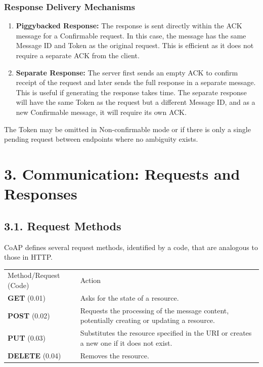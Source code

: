 \documentclass[a4paper, 12pt]{book} %
\begin{document}
\subsubsection{Response Delivery
Mechanisms}\label{response-delivery-mechanisms}

\begin{enumerate}
\def\labelenumi{\arabic{enumi}.}
\tightlist
\item
  \textbf{Piggybacked Response:} The response is sent directly within
  the ACK message for a Confirmable request. In this case, the message
  has the same Message ID and Token as the original request. This is
  efficient as it does not require a separate ACK from the client.
\item
  \textbf{Separate Response:} The server first sends an empty ACK to
  confirm receipt of the request and later sends the full response in a
  separate message. This is useful if generating the response takes
  time. The separate response will have the same Token as the request
  but a different Message ID, and as a new Confirmable message, it will
  require its own ACK.
\end{enumerate}

The Token may be omitted in Non-confirmable mode or if there is only a
single pending request between endpoints where no ambiguity exists.

\section{3. Communication: Requests and
Responses}\label{communication-requests-and-responses}

\subsection{3.1. Request Methods}\label{request-methods}

CoAP defines several request methods, identified by a code, that are
analogous to those in HTTP.

\begin{longtable}[]{@{}
  >{\raggedright\arraybackslash}p{}
  >{\raggedright\arraybackslash}p{}@{}}
\toprule\noalign{}
\endhead
\bottomrule\noalign{}
\endlastfoot
Method/Request (Code) & Action \\
\textbf{GET} (0.01) & Asks for the state of a resource. \\
\textbf{POST} (0.02) & Requests the processing of the message content,
potentially creating or updating a resource. \\
\textbf{PUT} (0.03) & Substitutes the resource specified in the URI or
creates a new one if it does not exist. \\
\textbf{DELETE} (0.04) & Removes the resource. \\
\end{longtable}
\end{document}
